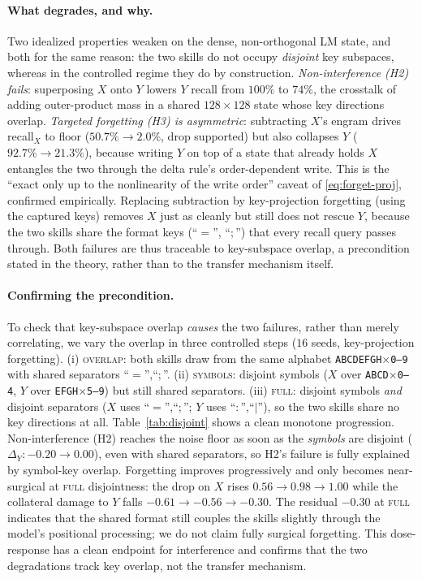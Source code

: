\documentclass[11pt]{article}
\theoremstyle{definition}
\begin{document}
\paragraph{What degrades, and why.}
Two idealized properties weaken on the dense, non-orthogonal LM state, and both for the same reason: the two skills do not occupy \emph{disjoint} key subspaces, whereas in the controlled regime they do by construction. \emph{Non-interference (H2) fails}: superposing $X$ onto $Y$ lowers $Y$ recall from $100\%$ to $74\%$, the crosstalk of adding outer-product mass in a shared $128\times128$ state whose key directions overlap. \emph{Targeted forgetting (H3) is asymmetric}: subtracting $X$'s engram drives recall$_X$ to floor ($50.7\%\!\to\!2.0\%$, drop supported) but also collapses $Y$ ($92.7\%\!\to\!21.3\%$), because writing $Y$ on top of a state that already holds $X$ entangles the two through the delta rule's order-dependent write. This is the ``exact only up to the nonlinearity of the write order'' caveat of \eqref{eq:forget-proj}, confirmed empirically. Replacing subtraction by key-projection forgetting (using the captured keys) removes $X$ just as cleanly but still does not rescue $Y$, because the two skills share the format keys (``$=$'', ``$;$'') that every recall query passes through. Both failures are thus traceable to key-subspace overlap, a precondition stated in the theory, rather than to the transfer mechanism itself.

\paragraph{Confirming the precondition.}
To check that key-subspace overlap \emph{causes} the two failures, rather than merely correlating, we vary the overlap in three controlled steps ($16$ seeds, key-projection forgetting). (i) \textsc{overlap}: both skills draw from the same alphabet \texttt{ABCDEFGH}$\times$\texttt{0--9} with shared separators ``$=$'',``$;$''. (ii) \textsc{symbols}: disjoint symbols ($X$ over \texttt{ABCD}$\times$\texttt{0--4}, $Y$ over \texttt{EFGH}$\times$\texttt{5--9}) but still shared separators. (iii) \textsc{full}: disjoint symbols \emph{and} disjoint separators ($X$ uses ``$=$'',``$;$''; $Y$ uses ``$:$'',``$|$''), so the two skills share no key directions at all. Table~\ref{tab:disjoint} shows a clean monotone progression. Non-interference (H2) reaches the noise floor as soon as the \emph{symbols} are disjoint ($\Delta_Y: -0.20 \to 0.00$), even with shared separators, so H2's failure is fully explained by symbol-key overlap. Forgetting improves progressively and only becomes near-surgical at \textsc{full} disjointness: the drop on $X$ rises $0.56 \to 0.98 \to 1.00$ while the collateral damage to $Y$ falls $-0.61 \to -0.56 \to -0.30$. The residual $-0.30$ at \textsc{full} indicates that the shared format still couples the skills slightly through the model's positional processing; we do not claim fully surgical forgetting. This dose-response has a clean endpoint for interference and confirms that the two degradations track key overlap, not the transfer mechanism.
\end{document}
